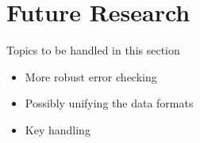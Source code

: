 \section{Future Research}

Topics to be handled in this section

\begin{itemize}
\item {More robust error checking}
\item {Possibly unifying the data formats}
\item {Key handling}
\end{itemize}